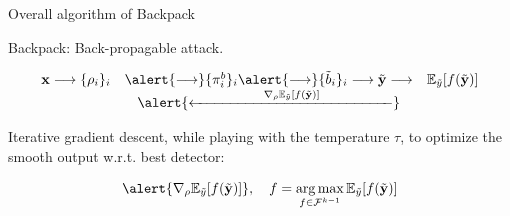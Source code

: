 \documentclass[10pt,aspectratio=169]{beamer}
\DeclareMathOperator*{\argmax}{arg\,max}
\begin{document}
\begin{frame}{Overall algorithm of Backpack}


    \alert{Backpack}: \alert{Back-p}ropagable att\alert{ack}.

    \begin{equation*}
        \begin{array}{ccc}
            \mathbf{x} \longrightarrow \{\rho_i\}_i & \alert{\longrightarrow}  \{\pi_i^b\}_i    \alert{\longrightarrow} \{\tilde{b}_i\}_i \longrightarrow  \tilde{\mathbf{y}}  \longrightarrow  & \mathbb{E}_{\tilde{y}}[f(\tilde{\mathbf{y}})] \\
            & \alert{\xleftarrow{\hspace{5em} \nabla_\rho \mathbb{E}_{\tilde{y}} [f(\tilde{\mathbf{y}})]\hspace{5em}}} 
        \end{array}
    \end{equation*}

    \pause
    Iterative gradient descent, while playing with the temperature $\tau$, to optimize the smooth output w.r.t. best detector:

    \begin{equation}
        \alert{\nabla_\rho \mathbb{E}_{\tilde{y}} [f(\tilde{\mathbf{y}})]}, \quad  f = \argmax_{f \in \mathcal{F}^{k-1}} \mathbb{E}_{\tilde{y}} [f(\tilde{\mathbf{y}})]
    \end{equation}

\end{frame}
\end{document}
